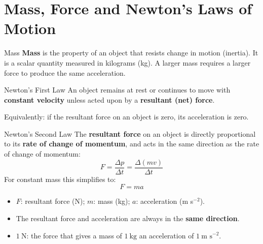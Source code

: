

\section{Mass, Force and Newton's Laws of Motion}

\begin{definitionbox}{Mass}
\textbf{Mass} is the property of an object that resists change in motion (inertia). It is a scalar quantity measured in kilograms (kg). A larger mass requires a larger force to produce the same acceleration.
\end{definitionbox}

\begin{definitionbox}{Newton's First Law}
An object remains at rest or continues to move with \textbf{constant velocity} unless acted upon by a \textbf{resultant (net) force}.

Equivalently: if the resultant force on an object is zero, its acceleration is zero.
\end{definitionbox}

\begin{definitionbox}{Newton's Second Law}
The \textbf{resultant force} on an object is directly proportional to its \textbf{rate of change of momentum}, and acts in the same direction as the rate of change of momentum:
$$F = \frac{\Delta p}{\Delta t} = \frac{\Delta(mv)}{\Delta t}$$
For constant mass this simplifies to:
$$F = ma$$
\begin{itemize}[itemsep=2pt]
  \item $F$: resultant force (N); \quad $m$: mass (kg); \quad $a$: acceleration (m s$^{-2}$).
  \item The resultant force and acceleration are always in the \textbf{same direction}.
  \item $1\ \text{N}$: the force that gives a mass of $1\ \text{kg}$ an acceleration of $1\ \text{m s}^{-2}$.
\end{itemize}
\end{definitionbox}

